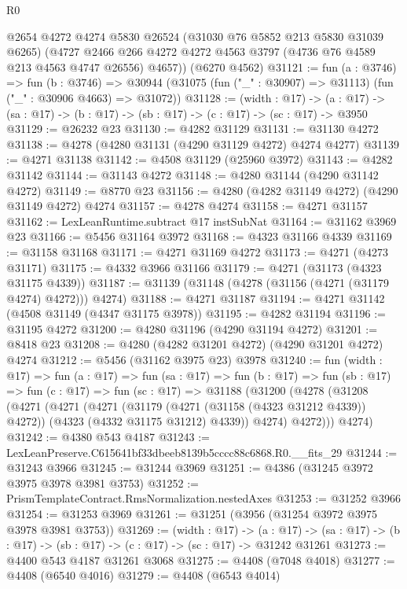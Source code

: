 \begin{lexlean}{R0}
\begin{coremodule}
      @2654
      @4272
      @4274
      @5830
      @26524
      (@31030 @76 @5852 @213 @5830 @31039 @6265)
      (@4727 @2466 @266 @4272 @4272 @4563 @3797 (@4736 @76 @4589 @213 @4563 @4747 @26556) @4657))
    (@6270 @4562)
@31121 := fun (a : @3746) =>
  fun (b : @3746) =>
  @30944 (@31075 (fun ("_" : @30907) => @31113) (fun ("_" : @30906 @4663) => @31072))
@31128 := (width : @17) ->
  (a : @17) -> (sa : @17) -> (b : @17) -> (sb : @17) -> (c : @17) -> (sc : @17) -> @3950
@31129 := @26232 @23
@31130 := @4282 @31129
@31131 := @31130 @4272
@31138 := @4278 (@4280 @31131 (@4290 @31129 @4272) @4274 @4277)
@31139 := @4271 @31138
@31142 := @4508 @31129 (@25960 @3972)
@31143 := @4282 @31142
@31144 := @31143 @4272
@31148 := @4280 @31144 (@4290 @31142 @4272)
@31149 := @8770 @23
@31156 := @4280 (@4282 @31149 @4272) (@4290 @31149 @4272) @4274
@31157 := @4278 @4274
@31158 := @4271 @31157
@31162 := LexLeanRuntime.subtract @17 instSubNat
@31164 := @31162 @3969 @23
@31166 := @5456 @31164 @3972
@31168 := @4323 @31166 @4339
@31169 := @31158 @31168
@31171 := @4271 @31169 @4272
@31173 := @4271 (@4273 @31171)
@31175 := @4332 @3966 @31166
@31179 := @4271 (@31173 (@4323 @31175 @4339))
@31187 := @31139 (@31148 (@4278 (@31156 (@4271 (@31179 @4274) @4272))) @4274)
@31188 := @4271 @31187
@31194 := @4271 @31142 (@4508 @31149 (@4347 @31175 @3978))
@31195 := @4282 @31194
@31196 := @31195 @4272
@31200 := @4280 @31196 (@4290 @31194 @4272)
@31201 := @8418 @23
@31208 := @4280 (@4282 @31201 @4272) (@4290 @31201 @4272) @4274
@31212 := @5456 (@31162 @3975 @23) @3978
@31240 := fun (width : @17) =>
  fun (a : @17) =>
  fun (sa : @17) =>
  fun (b : @17) =>
  fun (sb : @17) =>
  fun (c : @17) =>
  fun (sc : @17) =>
  @31188
    (@31200
      (@4278
        (@31208
          (@4271
            (@4271
              (@4271
                (@31179 (@4271 (@31158 (@4323 @31212 @4339)) @4272))
                (@4323 (@4332 @31175 @31212) @4339))
              @4274)
            @4272)))
      @4274)
@31242 := @4380 @543 @4187
@31243 := LexLeanPreserve.C615641bf33dbeeb8139b5cccc88c6868.R0.__fits_29
@31244 := @31243 @3966
@31245 := @31244 @3969
@31251 := @4386 (@31245 @3972 @3975 @3978 @3981 @3753)
@31252 := PrismTemplateContract.RmsNormalization.nestedAxes
@31253 := @31252 @3966
@31254 := @31253 @3969
@31261 := @31251 (@3956 (@31254 @3972 @3975 @3978 @3981 @3753))
@31269 := (width : @17) ->
  (a : @17) -> (sa : @17) -> (b : @17) -> (sb : @17) -> (c : @17) -> (sc : @17) -> @31242 @31261
@31273 := @4400 @543 @4187 @31261 @3068
@31275 := @4408 (@7048 @4018)
@31277 := @4408 (@6540 @4016)
@31279 := @4408 (@6543 @4014)

\end{coremodule}
\end{lexlean}

